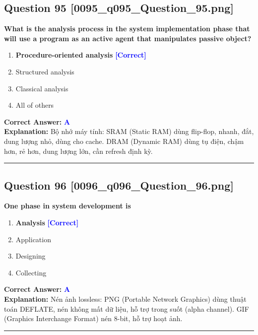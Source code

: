 \documentclass[11pt,a4paper]{article}
\begin{document}
\begin{minipage}{\textwidth}
\subsection*{Question 95 \quad \footnotesize{[0095\_q095\_Question\_95.png]}}
\noindent \textbf{What is the analysis process in the system implementation phase that will use a program as an active agent that manipulates passive object?}

\begin{enumerate}[label=\Alph*.]
    \item \textbf{Procedure-oriented analysis} \hfill \textcolor{blue}{\textbf{[Correct]}}
    \item Structured analysis
    \item Classical analysis
    \item All of others
\end{enumerate}

\noindent \textbf{Correct Answer:} \textcolor{blue}{\textbf{A}} \\[2pt]
\noindent \textbf{Explanation:} Bộ nhớ máy tính: SRAM (Static RAM) dùng flip-flop, nhanh, đắt, dung lượng nhỏ, dùng cho cache. DRAM (Dynamic RAM) dùng tụ điện, chậm hơn, rẻ hơn, dung lượng lớn, cần refresh định kỳ.

\par\vspace{0.3cm}
\hrule
\vspace{0.3cm}
\end{minipage}

\begin{minipage}{\textwidth}
\subsection*{Question 96 \quad \footnotesize{[0096\_q096\_Question\_96.png]}}
\noindent \textbf{One phase in system development is}

\begin{enumerate}[label=\Alph*.]
    \item \textbf{Analysis} \hfill \textcolor{blue}{\textbf{[Correct]}}
    \item Application
    \item Designing
    \item Collecting
\end{enumerate}

\noindent \textbf{Correct Answer:} \textcolor{blue}{\textbf{A}} \\[2pt]
\noindent \textbf{Explanation:} Nén ảnh lossless: PNG (Portable Network Graphics) dùng thuật toán DEFLATE, nén không mất dữ liệu, hỗ trợ trong suốt (alpha channel). GIF (Graphics Interchange Format) nén 8-bit, hỗ trợ hoạt ảnh.

\par\vspace{0.3cm}
\hrule
\vspace{0.3cm}
\end{minipage}
\end{document}

